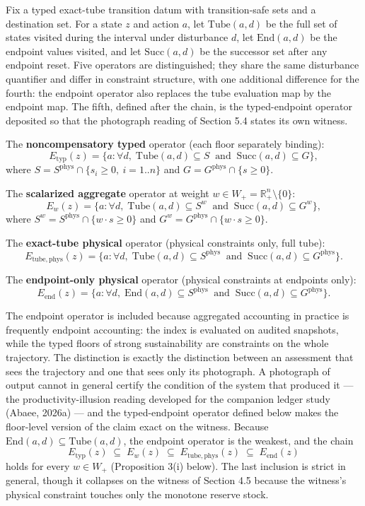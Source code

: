 \documentclass[11pt]{article}
\begin{document}
Fix a typed exact-tube transition datum with transition-safe sets and a
destination set. For a state \(z\) and action \(a\), let
\(\mathrm{Tube}(a,d)\) be the full set of states visited during the
interval under disturbance \(d\), let \(\mathrm{End}(a,d)\) be the
endpoint values visited, and let \(\mathrm{Succ}(a,d)\) be the successor
set after any endpoint reset. Five operators are distinguished; they
share the same disturbance quantifier and differ in constraint
structure, with one additional difference for the fourth: the endpoint
operator also replaces the tube evaluation map by the endpoint map. The
fifth, defined after the chain, is the typed-endpoint operator deposited
so that the photograph reading of Section 5.4 states its own witness.

The \textbf{noncompensatory typed} operator (each floor separately
binding):
\[E_{\mathrm{typ}}(z) = \{ a : \forall d,\; \mathrm{Tube}(a,d) \subseteq S \ \text{ and } \ \mathrm{Succ}(a,d) \subseteq G \},\]
where \(S = S^{\mathrm{phys}} \cap \{ s_i \ge 0,\ i = 1..n \}\) and
\(G = G^{\mathrm{phys}} \cap \{ s \ge 0 \}\).

The \textbf{scalarized aggregate} operator at weight
\(w \in W_+ = \mathbb{R}^n_+ \setminus \{0\}\):
\[E_w(z) = \{ a : \forall d,\; \mathrm{Tube}(a,d) \subseteq S^w \ \text{ and } \ \mathrm{Succ}(a,d) \subseteq G^w \},\]
where \(S^w = S^{\mathrm{phys}} \cap \{ w \cdot s \ge 0 \}\) and
\(G^w = G^{\mathrm{phys}} \cap \{ w \cdot s \ge 0 \}\).

The \textbf{exact-tube physical} operator (physical constraints only,
full tube):
\[E_{\mathrm{tube,phys}}(z) = \{ a : \forall d,\; \mathrm{Tube}(a,d) \subseteq S^{\mathrm{phys}} \ \text{ and } \ \mathrm{Succ}(a,d) \subseteq G^{\mathrm{phys}} \}.\]

The \textbf{endpoint-only physical} operator (physical constraints at
endpoints only):
\[E_{\mathrm{end}}(z) = \{ a : \forall d,\; \mathrm{End}(a,d) \subseteq S^{\mathrm{phys}} \ \text{ and } \ \mathrm{Succ}(a,d) \subseteq G^{\mathrm{phys}} \}.\]

The endpoint operator is included because aggregated accounting in
practice is frequently endpoint accounting: the index is evaluated on
audited snapshots, while the typed floors of strong sustainability are
constraints on the whole trajectory. The distinction is exactly the
distinction between an assessment that sees the trajectory and one that
sees only its photograph. A photograph of output cannot in general
certify the condition of the system that produced it --- the
productivity-illusion reading developed for the companion ledger study
(Abaee, 2026a) --- and the typed-endpoint operator
defined below makes the floor-level version of the claim exact on the
witness. Because \(\mathrm{End}(a,d) \subseteq \mathrm{Tube}(a,d)\), the
endpoint operator is the weakest, and the chain
\[E_{\mathrm{typ}}(z) \;\subseteq\; E_w(z) \;\subseteq\; E_{\mathrm{tube,phys}}(z) \;\subseteq\; E_{\mathrm{end}}(z)\]
holds for every \(w \in W_+\) (Proposition 3(i) below). The last
inclusion is strict in general, though it collapses on the witness of
Section 4.5 because the witness's physical constraint touches only the
monotone reserve stock.
\end{document}
